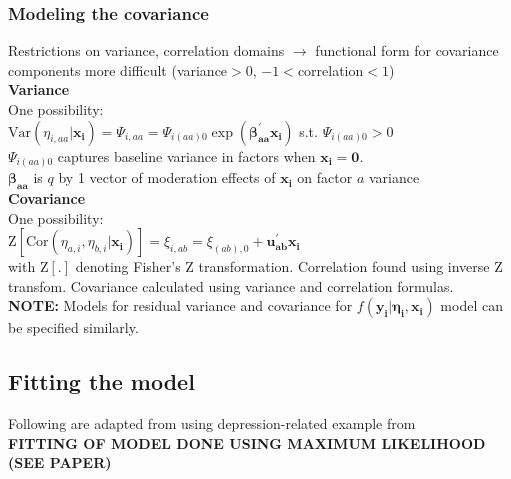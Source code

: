 \documentclass[12pt]{article}
\begin{document}
\subsubsection{Modeling the covariance}
Restrictions on variance, correlation domains $\rightarrow$ functional form for covariance components more difficult (variance$>$0, $-1<$correlation$<1$)\\

\noindent \textbf{Variance}\\
\noindent One possibility:\\

\noindent $\mbox{Var}(\eta_{i,aa}|\boldsymbol{x_i})=\Psi_{i,aa}=\Psi_{i(aa)0}\exp(\boldsymbol{{\beta}^{'}_{aa}}\boldsymbol{x_i})$ s.t. $\Psi_{i(aa)0}>0$\\

\noindent $\Psi_{i(aa)0}$ captures baseline variance in factors when $\boldsymbol{x_i}=\boldsymbol{0}$.\\
$\boldsymbol{{\beta}_{aa}}$ is $q$ by 1 vector of moderation effects of $\boldsymbol{x_i}$ on factor $a$ variance\\

\noindent \textbf{Covariance}\\
\noindent One possibility:\\

\noindent $\mbox{Z}[\mbox{Cor}(\eta_{a,i},\eta_{b,i}|\boldsymbol{x_i})]=\xi_{i,ab}=\xi_{(ab),0}+\boldsymbol{u^{'}_{ab}}\boldsymbol{x_i}$\\

\noindent with $\mbox{Z}[.]$ denoting Fisher's Z transformation.  Correlation found using inverse Z transfom.  Covariance calculated using variance and correlation formulas.\\

\noindent \textbf{NOTE:} Models for residual variance and covariance for $f(\boldsymbol{y_i}|\boldsymbol{\eta_i},\boldsymbol{x_i})$ model can be specified similarly.\\

\subsection{Fitting the model}\label{subsec:fit_model}
Following are adapted from \cite{bauer_2017, bauer_2017_supp} using depression-related example from \cite{curran_2014}\\

\noindent \textbf{FITTING OF MODEL DONE USING MAXIMUM LIKELIHOOD (SEE PAPER)}\\
\end{document}
